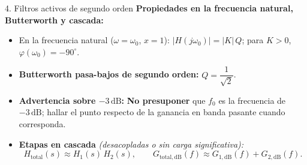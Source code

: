 \documentclass[10pt, a4paper]{article}
\begin{document}
\begin{formulabox}{4. Filtros activos de segundo orden}
    \textbf{Propiedades en la frecuencia natural, Butterworth y cascada:}
    \begin{itemize}
        \setlength{\itemsep}{2pt}
        \item En la frecuencia natural ($\omega = \omega_0$, $x = 1$): \quad $|H(j\omega_0)| = |K|\,Q$; \quad para $K > 0$, $\varphi(\omega_0) = -90^\circ$.
        \item \textbf{Butterworth pasa-bajos de segundo orden:} \quad $Q = \dfrac{1}{\sqrt{2}}$.
        \item \textbf{Advertencia sobre $-3\,\mathrm{dB}$:} \textbf{No presuponer} que $f_0$ es la frecuencia de $-3\,\mathrm{dB}$; hallar el punto respecto de la ganancia en banda pasante cuando corresponda.
        \item \textbf{Etapas en cascada} \textit{(desacopladas o sin carga significativa):}
        \begin{equation}
            H_{\mathrm{total}}(s) \approx H_1(s)\,H_2(s), \qquad G_{\mathrm{total,dB}}(f) \approx G_{1,\mathrm{dB}}(f) + G_{2,\mathrm{dB}}(f). \label{eq:cascada}
        \end{equation}
    \end{itemize}
\end{formulabox}
\end{document}
